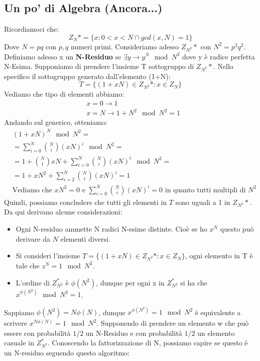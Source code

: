 \subsection{Un po' di Algebra (Ancora...)}
Ricordiamoci che:
\[Z_N* = \{x:0<x<N \cap gcd(x,N)=1\}\]
Dove $N = pq$ con $p,q$ numeri primi. Consideriamo adesso $Z_{N^2}*$ con $N^2 = p^2q^2$. Definiamo adesso x un \textbf{N-Residuo} se $\exists y \rightarrow y^N \mod N^2$ dove y è radice perfetta N-Esima. Supponiamo di prendere l'insieme T sottogruppo di $Z_{N^2}*$. Nello specifico il sottogruppo generato dall'elemento (1+N):
\[T=\{(1+xN)\in Z_{N^2}*: x \in Z_N \}\]
Vediamo che tipo di elementi abbiamo:
\begin{align*}
    & x= 0 \rightarrow 1\\
    & x = N \rightarrow 1+N^2 \mod N^2 = 1
\end{align*}
Andando sul generico, otteniamo:
\begin{align*}
    &(1+xN)^N \mod N^2 = \\
    &= \sum_{i=0}^N \binom{N}{i} (xN)^i \mod N^2 = \\
    &= 1 + \binom{N}{1} xN + \sum_{i=0}^N \binom{N}{i} (xN)^i \mod N^2 = \\
    &= 1+xN^2 + \sum_{i=2}^N \binom{N}{i} (xN)^i = 1 \\
    &\text{Vediamo che $xN^2 = 0$ e $\sum_{i=0}^N \binom{N}{i} (xN)^i = 0$ in quanto tutti multipli di $N^2$ }
\end{align*}
Quindi, possiamo concludere che tutti gli elementi in $T$ sono uguali a 1 in $Z_{N^2}*$. Da qui derivano alcune considerazioni:
\begin{itemize}
    \item Ogni N-residuo ammette N radici N-esime distinte. Cioè se ho $x^N$ questo può derivare da $N$ elementi diversi.
    \item Si consideri l'insieme $T=\{(1+xN)\in Z_{N^2}*: x \in Z_N\}$, ogni elemento in T è tale che $z^N = 1 \mod N^2$.
    \item L'ordine di $Z_{N^2}^{*}$ è $\phi(N^2)$, dunque per ogni x in $Z_{N^2}^{*}$ si ha che $x^{\phi(N^2)}\mod N^2 = 1$.
\end{itemize}
Sappiamo $\phi(N^2)=N\phi(N)$, dunque $x^{\phi(N^2)}=1 \mod N^2$ è equivalente a scrivere $x^{N\phi(N)}=1 \mod N^2$. 
Supponendo di prendere un elemento w che può essere con probabilità $1/2$ un N-Residuo e con probabilità $1/2$ un elemento casuale in $Z_{N^2}^{*}$. Conoscendo la fattorizzazione di N, possiamo capire se questo è un N-residuo seguendo questo algoritmo:
